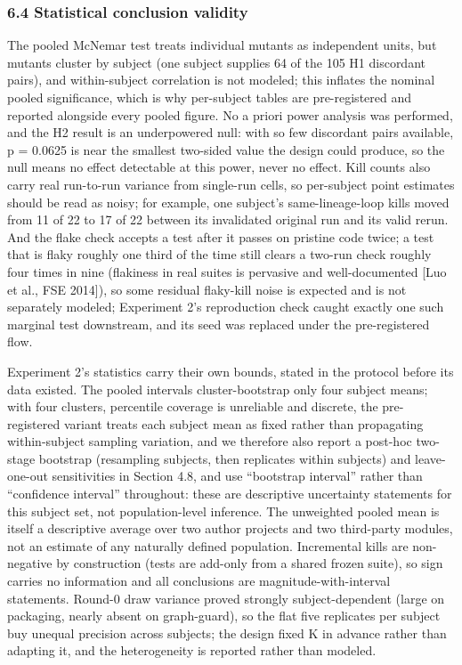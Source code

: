 \documentclass[
  11pt,
]{article}
\begin{document}
\subsubsection{6.4 Statistical conclusion
validity}\label{statistical-conclusion-validity}

The pooled McNemar test treats individual mutants as independent units,
but mutants cluster by subject (one subject supplies 64 of the 105 H1
discordant pairs), and within-subject correlation is not modeled; this
inflates the nominal pooled significance, which is why per-subject
tables are pre-registered and reported alongside every pooled figure. No
a priori power analysis was performed, and the H2 result is an
underpowered null: with so few discordant pairs available, p = 0.0625 is
near the smallest two-sided value the design could produce, so the null
means no effect detectable at this power, never no effect. Kill counts
also carry real run-to-run variance from single-run cells, so
per-subject point estimates should be read as noisy; for example, one
subject's same-lineage-loop kills moved from 11 of 22 to 17 of 22
between its invalidated original run and its valid rerun. And the flake
check accepts a test after it passes on pristine code twice; a test that
is flaky roughly one third of the time still clears a two-run check
roughly four times in nine (flakiness in real suites is pervasive and
well-documented {[}Luo et al., FSE 2014{]}), so some residual flaky-kill
noise is expected and is not separately modeled; Experiment 2's
reproduction check caught exactly one such marginal test downstream, and
its seed was replaced under the pre-registered flow.

Experiment 2's statistics carry their own bounds, stated in the protocol
before its data existed. The pooled intervals cluster-bootstrap only
four subject means; with four clusters, percentile coverage is
unreliable and discrete, the pre-registered variant treats each subject
mean as fixed rather than propagating within-subject sampling variation,
and we therefore also report a post-hoc two-stage bootstrap (resampling
subjects, then replicates within subjects) and leave-one-out
sensitivities in Section 4.8, and use ``bootstrap interval'' rather than
``confidence interval'' throughout: these are descriptive uncertainty
statements for this subject set, not population-level inference. The
unweighted pooled mean is itself a descriptive average over two author
projects and two third-party modules, not an estimate of any naturally
defined population. Incremental kills are non-negative by construction
(tests are add-only from a shared frozen suite), so sign carries no
information and all conclusions are magnitude-with-interval statements.
Round-0 draw variance proved strongly subject-dependent (large on
packaging, nearly absent on graph-guard), so the flat five replicates
per subject buy unequal precision across subjects; the design fixed K in
advance rather than adapting it, and the heterogeneity is reported
rather than modeled.
\end{document}

